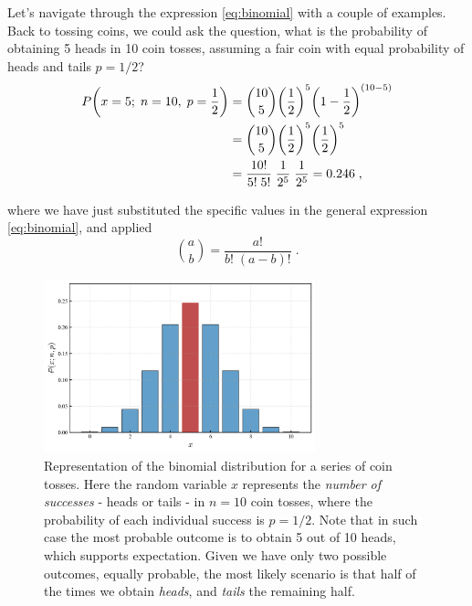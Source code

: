\documentclass{book}
\begin{document}
Let's navigate through the expression \eqref{eq:binomial} with a couple of examples. Back to tossing coins, we could ask the question, what is the probability of obtaining 5 heads in 10 coin tosses, assuming a fair coin with equal probability of heads and tails $p = 1/2$?
\begin{align}
    P\bigg(x=5; \; n = 10, \; p = \frac{1}{2}\bigg) & = \binom{10}{5} \bigg(\frac{1}{2}\bigg)^5 \bigg(1 - \frac{1}{2}\bigg)^{(10 - 5)}  \notag \\
	& = \binom{10}{5} \bigg(\frac{1}{2}\bigg)^5 \bigg(\frac{1}{2}\bigg)^5 \notag \\
	& = \frac{10!}{5! \; 5!} \; \frac{1}{2^5} \; \frac{1}{2^5} = 0.246 \; , \nonumber
\end{align}

where we have just substituted the specific values in the general expression \eqref{eq:binomial}, and applied
\begin{equation}
	\binom{a}{b} = \frac{a!}{b! \; (a - b)!} \; .
	\label{eq:combinatorial}
\end{equation}

\begin{figure}[ht]
    \centering
    \includegraphics[width=0.7\textwidth]{figures/chapter2/binomial_1.png}
    \caption{Representation of the binomial distribution for a series of coin tosses. Here the random variable $x$ represents the \textit{number of successes} - heads or tails - in $n = 10$ coin tosses, where the probability of each individual success is $p = 1/2$. Note that in such case the most probable outcome is to obtain 5 out of 10 heads, which supports expectation. Given we have only two possible outcomes, equally probable, the most likely scenario is that half of the times we obtain \textit{heads}, and \textit{tails} the remaining half.}
    \label{fig:binomial1}
\end{figure}
\end{document}

